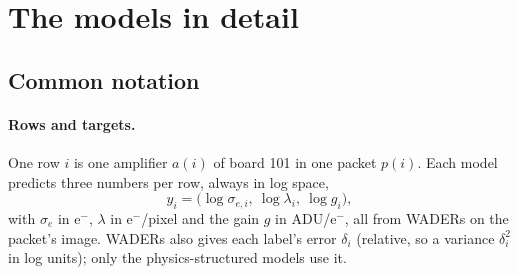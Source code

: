 
\section{The models in detail}
\label{app:models}

\subsection{Common notation}

\paragraph{Rows and targets.} One row $i$ is one amplifier $a(i)$ of board 101 in one packet $p(i)$. Each model predicts
three numbers per row, always in log space,
\[
y_i = \big(\log\sigma_{e,i},\ \log\lambda_i,\ \log g_i\big),
\]
with $\sigma_e$ in e$^-$, $\lambda$ in e$^-$/pixel and the gain $g$ in ADU/e$^-$, all from WADERs on the packet's image.
WADERs also gives each label's error $\delta_i$ (relative, so a variance $\delta_i^2$ in log units); only the
physics-structured models use it.

